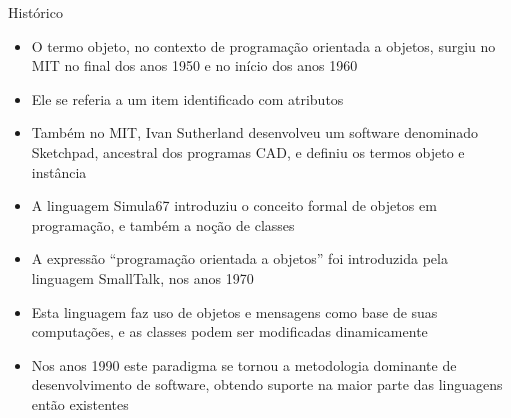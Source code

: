 \begin{frame}[fragile]{Histórico}

    \begin{itemize}
        \item O termo objeto, no contexto de programação orientada a objetos, surgiu no MIT no
            final dos anos 1950 e no início dos anos 1960

        \item Ele se referia a um item identificado com atributos

        \item Também no MIT, Ivan Sutherland desenvolveu um software denominado Sketchpad, ancestral
            dos programas CAD, e definiu os termos objeto e instância

        \item A linguagem Simula67 introduziu o conceito formal de objetos em programação, e também
            a noção de classes

        \item A expressão ``programação orientada a objetos'' foi introduzida pela linguagem 
            SmallTalk, nos anos 1970

        \item Esta linguagem faz uso de objetos e mensagens como base de suas computações, e as
            classes podem ser modificadas dinamicamente

        \item Nos anos 1990 este paradigma se tornou a metodologia dominante de desenvolvimento 
            de software, obtendo suporte na maior parte das linguagens então existentes
    \end{itemize}

\end{frame}


